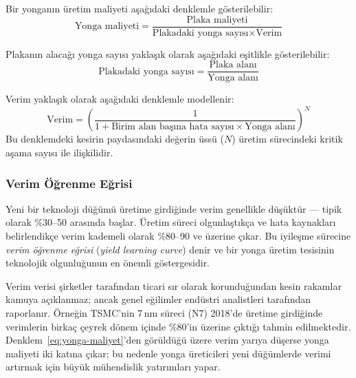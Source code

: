 Bir yonganın üretim maliyeti aşağıdaki denklemle gösterilebilir:
\begin{equation}
\text{Yonga maliyeti} = \frac{\text{Plaka maliyeti}}{\text{Plakadaki yonga sayısı} \times \text{Verim}}
\label{eq:yonga-maliyet}
\end{equation}

Plakanın alacağı yonga sayısı yaklaşık olarak aşağıdaki eşitlikle gösterilebilir:
\begin{equation}
\text{Plakadaki yonga sayısı} = \frac{\text{Plaka alanı}}{\text{Yonga alanı}}
\label{eq:yonga-sayisi}
\end{equation}

Verim yaklaşık olarak aşağıdaki denklemle modellenir:
\begin{equation}
\text{Verim} = \left( \frac{1}{1 + \text{Birim alan başına hata sayısı} \times \text{Yonga alanı}} \right)^{N}
\label{eq:verim}
\end{equation}
Bu denklemdeki kesirin paydasındaki değerin üssü ($N$) üretim sürecindeki kritik aşama sayısı ile ilişkilidir.

\subsubsection*{Verim Öğrenme Eğrisi}

Yeni bir teknoloji düğümü üretime girdiğinde verim genellikle düşüktür --- tipik olarak \%30--50 arasında başlar. Üretim süreci olgunlaştıkça ve hata kaynakları belirlendikçe verim kademeli olarak \%80--90 ve üzerine çıkar. Bu iyileşme sürecine \emph{verim öğrenme eğrisi} (\emph{yield learning curve}) denir ve bir yonga üretim tesisinin teknolojik olgunluğunun en önemli göstergesidir.

Verim verisi şirketler tarafından ticari sır olarak korunduğundan kesin rakamlar kamuya açıklanmaz; ancak genel eğilimler endüstri analistleri tarafından raporlanır. Örneğin TSMC'nin 7\,nm süreci (N7) 2018'de üretime girdiğinde verimlerin birkaç çeyrek dönem içinde \%80'in üzerine çıktığı tahmin edilmektedir. Denklem~\ref{eq:yonga-maliyet}'den görüldüğü üzere verim yarıya düşerse yonga maliyeti iki katına çıkar; bu nedenle yonga üreticileri yeni düğümlerde verimi artırmak için büyük mühendislik yatırımları yapar.

